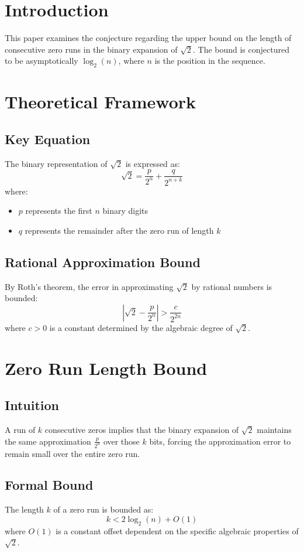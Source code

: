 \section{Introduction}
This paper examines the conjecture regarding the upper bound on the length of consecutive zero runs in the binary expansion of $\sqrt{2}$. The bound is conjectured to be asymptotically $\log_2(n)$, where $n$ is the position in the sequence.
\section{Theoretical Framework}
\subsection{Key Equation}
The binary representation of $\sqrt{2}$ is expressed as:
\begin{equation}
\sqrt{2} = \frac{p}{2^n} + \frac{q}{2^{n+k}}
\end{equation}
where:
\begin{itemize}
\item $p$ represents the first $n$ binary digits
\item $q$ represents the remainder after the zero run of length $k$
\end{itemize}
\subsection{Rational Approximation Bound}
By Roth's theorem, the error in approximating $\sqrt{2}$ by rational numbers is bounded:
\begin{equation}
\left|\sqrt{2} - \frac{p}{2^n}\right| > \frac{c}{2^{2n}}
\end{equation}
where $c > 0$ is a constant determined by the algebraic degree of $\sqrt{2}$.
\section{Zero Run Length Bound}
\subsection{Intuition}
A run of $k$ consecutive zeros implies that the binary expansion of $\sqrt{2}$ maintains the same approximation $\frac{p}{2^n}$ over those $k$ bits, forcing the approximation error to remain small over the entire zero run.
\subsection{Formal Bound}
The length $k$ of a zero run is bounded as:
\begin{equation}
k < 2\log_2(n) + O(1)
\end{equation}
where $O(1)$ is a constant offset dependent on the specific algebraic properties of $\sqrt{2}$.
